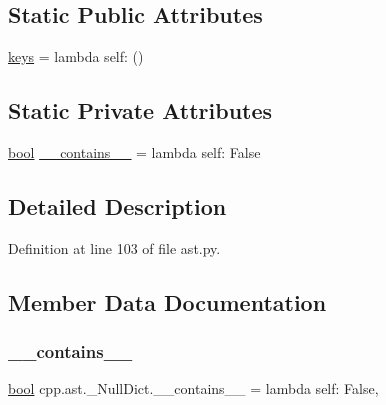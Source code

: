 \subsection*{Static Public Attributes}
\begin{DoxyCompactItemize}
\item 
\hyperlink{classcpp_1_1ast_1_1__NullDict_abb0b7884aa59bede0a8503dffcd1733f}{keys} = lambda self\+: ()
\end{DoxyCompactItemize}
\subsection*{Static Private Attributes}
\begin{DoxyCompactItemize}
\item 
\hyperlink{classbool}{bool} \hyperlink{classcpp_1_1ast_1_1__NullDict_a75119a0b9fd6366573f41d7e9eddec80}{\+\_\+\+\_\+contains\+\_\+\+\_\+} = lambda self\+: False
\end{DoxyCompactItemize}


\subsection{Detailed Description}


Definition at line 103 of file ast.\+py.



\subsection{Member Data Documentation}
\mbox{\label{classcpp_1_1ast_1_1__NullDict_a75119a0b9fd6366573f41d7e9eddec80}} 
\subsubsection{\texorpdfstring{\+\_\+\+\_\+contains\+\_\+\+\_\+}{\_\_contains\_\_}}
{\footnotesize\ttfamily \hyperlink{classbool}{bool} cpp.\+ast.\+\_\+\+Null\+Dict.\+\_\+\+\_\+contains\+\_\+\+\_\+ = lambda self\+: False\hspace{0.3cm}{\ttfamily [static]}, {\ttfamily [private]}}



